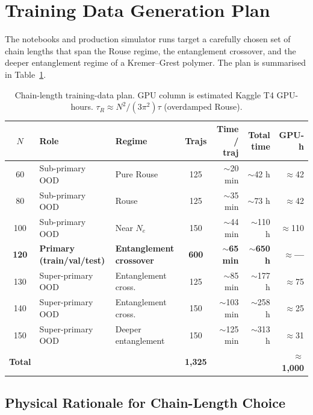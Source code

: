 \documentclass[12pt,a4paper]{article}
\begin{document}
\section{Training Data Generation Plan}
\label{sec:data-plan}

The notebooks and production simulator runs target a carefully chosen set of
chain lengths that span the Rouse regime, the entanglement crossover, and the
deeper entanglement regime of a Kremer--Grest polymer.  The plan is summarised
in Table~\ref{tab:data-plan}.

\begin{table}[h]
\centering
\caption{Chain-length training-data plan. GPU column is estimated Kaggle T4 GPU-hours.
  $\tau_R \approx N^2/(3\pi^2)\tau$ (overdamped Rouse).}
\label{tab:data-plan}
\begin{tabular}{cllcrrr}
\toprule
$N$ & Role & Regime & Trajs & Time / traj & Total time & GPU-h \\
\midrule
 60  & Sub-primary OOD & Pure Rouse                & 125 & $\sim$20 min & $\sim$42 h  & $\approx$42 \\
 80  & Sub-primary OOD & Rouse                     & 125 & $\sim$35 min & $\sim$73 h  & $\approx$42 \\
100  & Sub-primary OOD & Near $N_e$                & 150 & $\sim$44 min & $\sim$110 h & $\approx$110 \\
\textbf{120} & \textbf{Primary (train/val/test)} & \textbf{Entanglement crossover} & \textbf{600} & \textbf{$\sim$65 min} & \textbf{$\sim$650 h} & $\approx$\textbf{---} \\
130  & Super-primary OOD & Entanglement cross.      & 125 & $\sim$85 min & $\sim$177 h & $\approx$75 \\
140  & Super-primary OOD & Entanglement cross.      & 150 & $\sim$103 min& $\sim$258 h & $\approx$25 \\
150  & Super-primary OOD & Deeper entanglement       & 150 & $\sim$125 min& $\sim$313 h & $\approx$31 \\
\midrule
\textbf{Total} & & & \textbf{1,325} & & & $\approx$\textbf{1,000} \\
\bottomrule
\end{tabular}
\end{table}

\subsection{Physical Rationale for Chain-Length Choice}
\end{document}
